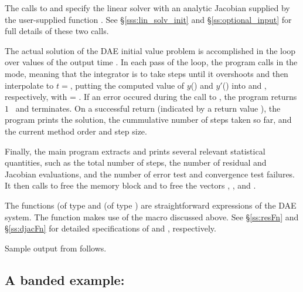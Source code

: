 The calls to  and  specify the {\idadense}
linear solver with an analytic Jacobian supplied by the user-supplied function
.  See \S\ref{sss:lin_solv_init} and \S\ref{ss:optional_input}
for full details of these two calls.

The actual solution of the DAE initial value problem is accomplished in
the loop over values of the output time .  In each pass of the
loop, the program calls  in the  mode, meaning that
the integrator is to take steps until it overshoots  and then
interpolate to $t = $, putting the computed value of $y$()
and $y'$() into  and , respectively, with  = . 
If an error occured during the call to , the program returns $1$ \
and terminates.
On a successful return (indicated by a return value ), the program
prints the solution, the cummulative number of steps taken so far, and the 
current method order and step size.

Finally, the main program extracts and prints several relevant statistical quantities,
such as the total number of steps, the number of residual and Jacobian evaluations, and
the number of error test and convergence test failures.
It then calls  to free the {\ida} memory block and  
to free the vectors \id{yy}, \id{yp}, and \id{avtol}. 

The functions  (of type  and  (of type ) 
are straightforward expressions of the DAE system. 
The function  makes use of the macro  discussed above.
See \S\ref{ss:resFn} and \S\ref{ss:djacFn} for detailed specifications of  and 
\id{IDADenseJacFn}, respectively.

Sample output from  follows.

\subsection{A banded example: }\label{ss:iwebsb}

